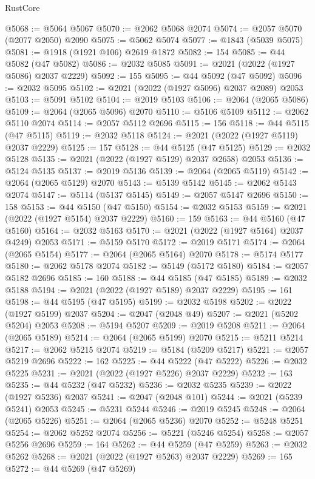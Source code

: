 \begin{lexlean}{RustCore}
\begin{coremodule}
@5068 := @5064 @5067
@5070 := @2062 @5068 @2074
@5074 := @2057 @5070 (@2077 @2050) @2090
@5075 := @5062 @5074
@5077 := @1843 (@5039 @5075)
@5081 := @1918 (@1921 @106) @2619 @1872
@5082 := 154
@5085 := @44 @5082 (@47 @5082)
@5086 := @2032 @5085
@5091 := @2021 (@2022 (@1927 @5086) @2037 @2229)
@5092 := 155
@5095 := @44 @5092 (@47 @5092)
@5096 := @2032 @5095
@5102 := @2021 (@2022 (@1927 @5096) @2037 @2089) @2053
@5103 := @5091 @5102
@5104 := @2019 @5103
@5106 := @2064 (@2065 @5086)
@5109 := @2064 (@2065 @5096) @2070
@5110 := @5106 @5109
@5112 := @2062 @5110 @2074
@5114 := @2057 @5112 @2696
@5115 := 156
@5118 := @44 @5115 (@47 @5115)
@5119 := @2032 @5118
@5124 := @2021 (@2022 (@1927 @5119) @2037 @2229)
@5125 := 157
@5128 := @44 @5125 (@47 @5125)
@5129 := @2032 @5128
@5135 := @2021 (@2022 (@1927 @5129) @2037 @2658) @2053
@5136 := @5124 @5135
@5137 := @2019 @5136
@5139 := @2064 (@2065 @5119)
@5142 := @2064 (@2065 @5129) @2070
@5143 := @5139 @5142
@5145 := @2062 @5143 @2074
@5147 := @5114 (@5137 @5145)
@5149 := @2057 @5147 @2696
@5150 := 158
@5153 := @44 @5150 (@47 @5150)
@5154 := @2032 @5153
@5159 := @2021 (@2022 (@1927 @5154) @2037 @2229)
@5160 := 159
@5163 := @44 @5160 (@47 @5160)
@5164 := @2032 @5163
@5170 := @2021 (@2022 (@1927 @5164) @2037 @4249) @2053
@5171 := @5159 @5170
@5172 := @2019 @5171
@5174 := @2064 (@2065 @5154)
@5177 := @2064 (@2065 @5164) @2070
@5178 := @5174 @5177
@5180 := @2062 @5178 @2074
@5182 := @5149 (@5172 @5180)
@5184 := @2057 @5182 @2696
@5185 := 160
@5188 := @44 @5185 (@47 @5185)
@5189 := @2032 @5188
@5194 := @2021 (@2022 (@1927 @5189) @2037 @2229)
@5195 := 161
@5198 := @44 @5195 (@47 @5195)
@5199 := @2032 @5198
@5202 := @2022 (@1927 @5199) @2037
@5204 := @2047 (@2048 @49)
@5207 := @2021 (@5202 @5204) @2053
@5208 := @5194 @5207
@5209 := @2019 @5208
@5211 := @2064 (@2065 @5189)
@5214 := @2064 (@2065 @5199) @2070
@5215 := @5211 @5214
@5217 := @2062 @5215 @2074
@5219 := @5184 (@5209 @5217)
@5221 := @2057 @5219 @2696
@5222 := 162
@5225 := @44 @5222 (@47 @5222)
@5226 := @2032 @5225
@5231 := @2021 (@2022 (@1927 @5226) @2037 @2229)
@5232 := 163
@5235 := @44 @5232 (@47 @5232)
@5236 := @2032 @5235
@5239 := @2022 (@1927 @5236) @2037
@5241 := @2047 (@2048 @101)
@5244 := @2021 (@5239 @5241) @2053
@5245 := @5231 @5244
@5246 := @2019 @5245
@5248 := @2064 (@2065 @5226)
@5251 := @2064 (@2065 @5236) @2070
@5252 := @5248 @5251
@5254 := @2062 @5252 @2074
@5256 := @5221 (@5246 @5254)
@5258 := @2057 @5256 @2696
@5259 := 164
@5262 := @44 @5259 (@47 @5259)
@5263 := @2032 @5262
@5268 := @2021 (@2022 (@1927 @5263) @2037 @2229)
@5269 := 165
@5272 := @44 @5269 (@47 @5269)

\end{coremodule}
\end{lexlean}
